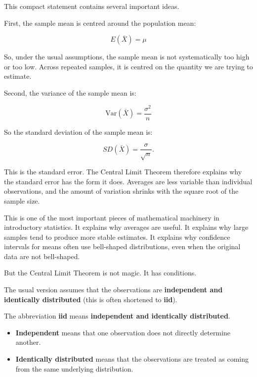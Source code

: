 \documentclass[
  letterpaper,
  DIV=11,
  numbers=noendperiod]{scrreprt}
\begin{document}
This compact statement contains several important ideas.

First, the sample mean is centred around the population mean:

\[
E(\bar{X}) = \mu
\]

So, under the usual assumptions, the sample mean is not systematically
too high or too low. Across repeated samples, it is centred on the
quantity we are trying to estimate.

Second, the variance of the sample mean is:

\[
\text{Var}(\bar{X})
=
\frac{\sigma^2}{n}
\]

So the standard deviation of the sample mean is:

\[
SD(\bar{X})
=
\frac{\sigma}{\sqrt{n}}.
\]

This is the standard error. The Central Limit Theorem therefore explains
why the standard error has the form it does. Averages are less variable
than individual observations, and the amount of variation shrinks with
the square root of the sample size.

This is one of the most important pieces of mathematical machinery in
introductory statistics. It explains why averages are useful. It
explains why large samples tend to produce more stable estimates. It
explains why confidence intervals for means often use bell-shaped
distributions, even when the original data are not bell-shaped.

But the Central Limit Theorem is not magic. It has conditions.

The usual version assumes that the observations are \textbf{independent
and identically distributed} (this is often shortened to \textbf{iid}).

\begin{tcolorbox}[enhanced jigsaw, arc=.35mm, bottomrule=.15mm, bottomtitle=1mm, breakable, colback=white, colbacktitle=quarto-callout-note-color!10!white, colframe=quarto-callout-note-color-frame, coltitle=black, left=2mm, leftrule=.75mm, opacityback=0, opacitybacktitle=0.6, rightrule=.15mm, title=\textcolor{quarto-callout-note-color}{\faInfo}\hspace{0.5em}{Terminology: iid}, titlerule=0mm, toprule=.15mm, toptitle=1mm]

The abbreviation \textbf{iid} means \textbf{independent and identically
distributed}.

\begin{itemize}
\item
  \textbf{Independent} means that one observation does not directly
  determine another.
\item
  \textbf{Identically distributed} means that the observations are
  treated as coming from the same underlying distribution.
\end{itemize}

\end{tcolorbox}
\end{document}
